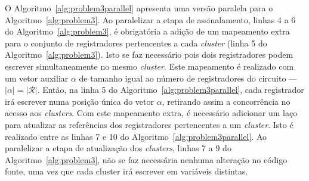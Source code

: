 

O Algoritmo~\ref{alg:problem3parallel} apresenta uma versão paralela para o Algoritmo~\ref{alg:problem3}.
Ao paralelizar a etapa de assinalamento, linhas 4 a 6 do Algoritmo~\ref{alg:problem3}, é obrigatória a adição de um mapeamento extra para o conjunto de registradores pertencentes a cada \textit{cluster} (linha 5 do Algoritmo~\ref{alg:problem3}). Isto se faz necessário pois dois registradores podem escrever simultaneamente no mesmo \textit{cluster}.
Este mapeamento é realizado com um vetor auxiliar $\alpha$ de tamanho igual ao número de registradores do circuito --- $|\alpha| = |\mathcal{R}|$.
Então, na linha 5 do Algoritmo~\ref{alg:problem3parallel}, cada registrador irá escrever numa posição única do vetor $\alpha$, retirando assim a concorrência no acesso aos \textit{clusters}.
Com este mapeamento extra, é necessário adicionar um laço para atualizar as referências dos registradores pertencentes a um \textit{cluster}.
Isto é realizado entre as linhas 7 e 10 do Algoritmo~\ref{alg:problem3parallel}.
Ao paralelizar a etapa de atualização dos \textit{clusters}, linhas  7 a 9 do Algoritmo~\ref{alg:problem3}, não se faz necessária nenhuma alteração no código fonte, uma vez que cada cluster irá escrever em variáveis distintas.

